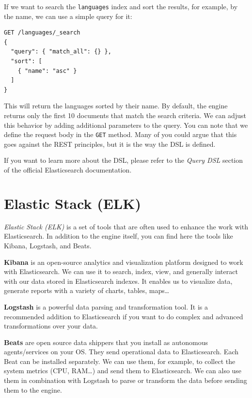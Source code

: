 \documentclass[12pt,a4,twoside]{article}
\newenvironment{code}{\captionsetup{type=listing, justification=centering}}{}
\begin{document}
If we want to search the \texttt{languages} index and sort the results, for example, by the name, we can use a simple query for it:

\begin{code}
\begin{verbatim}
GET /languages/_search
{
  "query": { "match_all": {} },
  "sort": [
    { "name": "asc" }
  ]
}
\end{verbatim}
\label{code:search_data}
\end{code}

This will return the languages sorted by their name. By default, the engine returns only the first 10 documents that match the search criteria. We can adjust this behavior by adding additional parameters to the query. You can note that we define the request body in the \texttt{GET} method. Many of you could argue that this goes against the REST principles, but it is the way the DSL is defined.

If you want to learn more about the DSL, please refer to the \textit{Query DSL} \cite{query_dsl} section of the official Elasticsearch documentation.

\section{Elastic Stack (ELK)}

\textit{Elastic Stack (ELK)} is a set of tools that are often used to enhance the work with Elasticsearch. In addition to the engine itself, you can find here the tools like Kibana, Logstash, and Beats.

\textbf{Kibana} is an open-source analytics and visualization platform designed to work with Elasticsearch. We can use it to search, index, view, and generally interact with our data stored in Elasticsearch indexes. It enables us to visualize data, generate reports with a variety of charts, tables, maps\dots

\textbf{Logstash} is a powerful data parsing and transformation tool. It is a recommended addition to Elasticsearch if you want to do complex and advanced transformations over your data.

\textbf{Beats} are open source data shippers that you install as autonomous agents/services on your OS. They send operational data to Elasticsearch. Each Beat can be installed separately. We can use them, for example, to collect the system metrics (CPU, RAM\dots) and send them to Elasticsearch. We can also use them in combination with Logstash to parse or transform the data before sending them to the engine.
\end{document}

